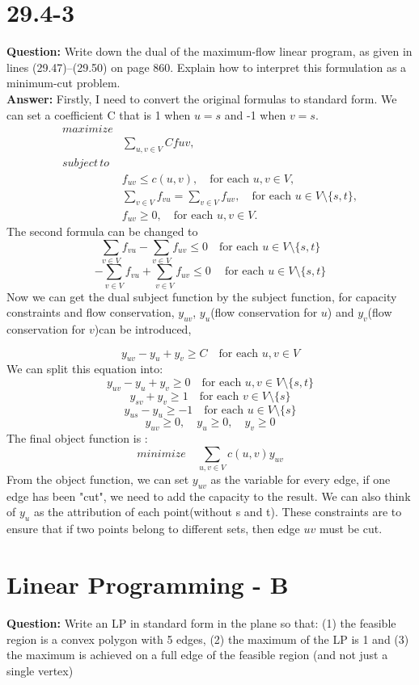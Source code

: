 \documentclass[12pt]{article}
\begin{document}
\section{29.4-3}
\textbf{Question:}
Write down the dual of the maximum-flow linear program, as given in lines
(29.47)–(29.50) on page 860. Explain how to interpret this formulation as a
minimum-cut problem.\\
\textbf{Answer:}
Firstly, I need to convert the original formulas to standard form.
We can set a coefficient C that is 1 when \(u=s\) and -1 when \(v=s\).
\[
\begin{aligned}
maximize& \\
&\sum_{u,v \in V} Cfuv, \\
subject \, to& \\
&f_{uv} \leq c(u, v), \quad \text{for each } u, v \in V, \\
&\sum_{v \in V} f_{vu} = \sum_{v \in V} f_{uv}, \quad \text{for each } u \in V \setminus \{s, t\}, \\
&f_{uv} \geq 0, \quad \text{for each } u, v \in V.
\end{aligned}
\]
The second formula can be changed to 
\[
\sum_{v \in V} f_{vu} - \sum_{v \in V} f_{uv} \leq 0 \quad \text{for each } u \in V \setminus \{s, t\}
\]
\[-\sum_{v \in V} f_{vu} + \sum_{v \in V} f_{uv} \leq 0\ \quad \text{for each } u \in V \setminus \{s, t\}\]
Now we can get the dual subject function by the subject function, for capacity constraints and flow conservation, \(y_{uv}\), \(y_u\)(flow conservation for \(u\)) and \(y_v\)(flow conservation for \(v\))can be introduced, 

\[y_{uv}-y_u+y_v \geq C \quad \text{for each } u, v \in V\]
We can split this equation into:
\[y_{uv}-y_u+y_v \geq 0 \quad \text{for each } u, v \in V\setminus \{s, t\}\]
\[y_{sv}+y_v \geq 1 \quad \text{for each } v \in V\setminus \{s\}\]
\[y_{us}-y_u \geq -1 \quad \text{for each } u \in V\setminus \{s\}\]
\[y_{uv} \geq 0, \quad y_u \geq 0,\quad y_v\geq 0\]
The final object function is :
\[minimize \quad \sum_{u,v \in V} c(u,v)y_{uv}\]
From the object function, we can set \(y_{uv}\) as the variable for every edge, if one edge has been "cut", we need to add the capacity to the result. We can also think of \(y_u\) as the attribution of each point(without s and t). These constraints are to ensure that if two points belong to different sets, then edge \(uv\) must be cut.




\section{Linear Programming - B}
\textbf{Question:}
Write an LP in standard form in the plane so that: (1) the feasible region is a convex polygon with 5 edges, (2) the maximum of the LP is 1 and (3) the maximum is achieved on a full edge of the feasible region (and not just a single vertex)
\end{document}
